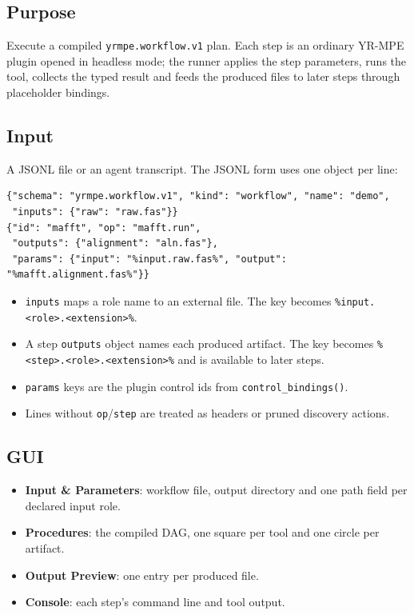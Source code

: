 \documentclass[11pt]{report}
\begin{document}
\subsection{Purpose}

Execute a compiled \texttt{yrmpe.\allowbreak workflow.\allowbreak v1} plan. Each step is an ordinary YR-MPE plugin opened in headless mode; the runner applies the step parameters, runs the tool, collects the typed result and feeds the produced files to later steps through placeholder bindings.

\subsection{Input}

A JSONL file or an agent transcript. The JSONL form uses one object per line:

\begin{lstlisting}
{"schema": "yrmpe.workflow.v1", "kind": "workflow", "name": "demo",
 "inputs": {"raw": "raw.fas"}}
{"id": "mafft", "op": "mafft.run",
 "outputs": {"alignment": "aln.fas"},
 "params": {"input": "%input.raw.fas%", "output": "%mafft.alignment.fas%"}}
\end{lstlisting}

\begin{itemize}
  \item \texttt{inputs} maps a role name to an external file. The key becomes \texttt{\%input.\allowbreak <role>.\allowbreak <extension>\%}.
  \item A step \texttt{outputs} object names each produced artifact. The key becomes \texttt{\%<step>.\allowbreak <role>.\allowbreak <extension>\%} and is available to later steps.
  \item \texttt{params} keys are the plugin control ids from \texttt{control\_\allowbreak bindings\allowbreak ()}.
  \item Lines without \texttt{op}/\texttt{step} are treated as headers or pruned discovery actions.
\end{itemize}

\subsection{GUI}

\begin{itemize}
  \item \textbf{Input \& Parameters}: workflow file, output directory and one path field per declared input role.
  \item \textbf{Procedures}: the compiled DAG, one square per tool and one circle per artifact.
  \item \textbf{Output Preview}: one entry per produced file.
  \item \textbf{Console}: each step's command line and tool output.
\end{itemize}
\end{document}
